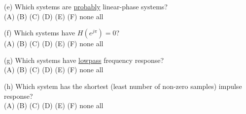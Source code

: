 \documentclass[12pt]{report}
\begin{document}
\begin{description}
	\item{(e) } Which systems are \underline{probably} linear-phase systems? \\
	\hspace{10cm} (A)  \hspace{1cm}  (B)  \hspace{1cm}  (C) \hspace{1cm} (D) \hspace{1cm}  (E) \hspace{1cm} (F) \hspace{1cm} none \hspace{1cm}  all
	
	\item{(f) } Which systems have $H(e^{j\pi})=0$? \\
	\hspace{10cm} (A)  \hspace{1cm}  (B)  \hspace{1cm}  (C) \hspace{1cm} (D) \hspace{1cm}  (E) \hspace{1cm} (F) \hspace{1cm} none \hspace{1cm}  all
	
	\item{(g) } Which systems have \underline{lowpass} frequency response? \\
	\hspace{10cm} (A)  \hspace{1cm}  (B)  \hspace{1cm}  (C) \hspace{1cm} (D) \hspace{1cm}  (E) \hspace{1cm} (F) \hspace{1cm} none \hspace{1cm}  all
	
	\item{(h) } Which system has the shortest (least number of non-zero samples) impulse response? \\
	\hspace{10cm} (A)  \hspace{1cm}  (B)  \hspace{1cm}  (C) \hspace{1cm} (D) \hspace{1cm}  (E) \hspace{1cm} (F) \hspace{1cm} none \hspace{1cm}  all
	

\end{description}
\end{document}
